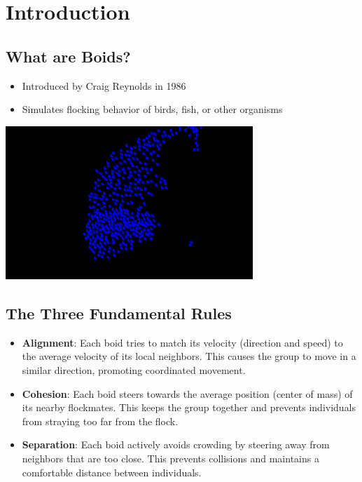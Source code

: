 \chapter{Introduction}

\section{What are Boids?}

\begin{minipage}{0.99\textwidth}
    \begin{itemize}
        \item Introduced by Craig Reynolds in 1986
        \item Simulates flocking behavior of birds, fish, or other organisms
    \end{itemize}
    \begin{center}
        \includegraphics[width=0.7\textwidth]{../../images/boidsvisualizzationexample.png}
    \end{center}
\end{minipage}

\section{The Three Fundamental Rules}

\begin{itemize}
    \item \textbf{Alignment}: Each boid tries to match its velocity (direction and speed) to the average velocity of its local neighbors. This causes the group to move in a similar direction, promoting coordinated movement.
    \item \textbf{Cohesion}: Each boid steers towards the average position (center of mass) of its nearby flockmates. This keeps the group together and prevents individuals from straying too far from the flock.
    \item \textbf{Separation}: Each boid actively avoids crowding by steering away from neighbors that are too close. This prevents collisions and maintains a comfortable distance between individuals.
\end{itemize}

